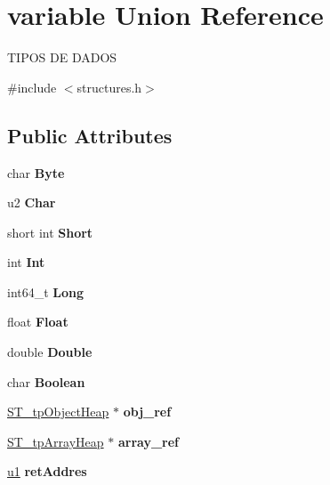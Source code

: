\hypertarget{unionvariable}{}\section{variable Union Reference}
\label{unionvariable}




 T\+I\+P\+OS DE D\+A\+D\+OS  




{\ttfamily \#include $<$structures.\+h$>$}

\subsection*{Public Attributes}
\begin{DoxyCompactItemize}
\item 
\mbox{\label{unionvariable_a14da781c997d776a4ef8c08d2b95834d}} 
char {\bfseries Byte}
\item 
\mbox{\label{unionvariable_ac35c29591a76904d81692e1f32fc280d}} 
u2 {\bfseries Char}
\item 
\mbox{\label{unionvariable_aa7c131dfbc4ac38e6068de19429cfbce}} 
short int {\bfseries Short}
\item 
\mbox{\label{unionvariable_a553cd9baf05616015712a32d54b759d6}} 
int {\bfseries Int}
\item 
\mbox{\label{unionvariable_ab0d8fc18c0c98c11789c3228a1d0f71a}} 
int64\+\_\+t {\bfseries Long}
\item 
\mbox{\label{unionvariable_a564500c4bea931600b7e80681b47fe89}} 
float {\bfseries Float}
\item 
\mbox{\label{unionvariable_acbd00a6cb29eb4f6b374b18b7cdd44a2}} 
double {\bfseries Double}
\item 
\mbox{\label{unionvariable_a8410f688f1729a49d06752a9a2cc4a48}} 
char {\bfseries Boolean}
\item 
\mbox{\label{unionvariable_a6716ec6c26403667fae1c202b779ee39}} 
\mbox{\hyperlink{structures_8h_a3900130849091c366c32df1a3af32bfe}{S\+T\+\_\+tp\+Object\+Heap}} $\ast$ {\bfseries obj\+\_\+ref}
\item 
\mbox{\label{unionvariable_a59bbf687af68a864bdde033a04e528c2}} 
\mbox{\hyperlink{structures_8h_a9da06389548e0b5bfa02d07cf8b5c99e}{S\+T\+\_\+tp\+Array\+Heap}} $\ast$ {\bfseries array\+\_\+ref}
\item 
\mbox{\label{unionvariable_a1de0af1a612e47664e7022b3b89b765a}} 
\mbox{\hyperlink{structures_8h_ad9f4cdb6757615aae2fad89dab3c5470}{u1}} {\bfseries ret\+Addres}
\end{DoxyCompactItemize}



